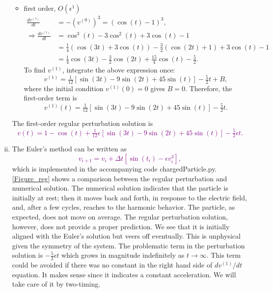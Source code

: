 \documentclass[12pt]{article}
\begin{document}
\begin{ex}
\begin{solution}
\begin{enumerate}[(i)]
\begin{itemize}
    \item first order, $O(\epsilon^1)$
      \begin{align*}
        \frac{dv^{(1)}}{dt}&=-\left(v^{(0)}\right)^3=(\cos(t)-1)^3,\\
        \Rightarrow\frac{dv^{(1)}}{dt}&=\cos^3(t)-3\cos^2(t)+3\cos(t)-1\\
        &=\tfrac{1}{4}(\cos(3t)+3\cos(t))-\tfrac{3}{2}(\cos(2t)+1)+3\cos(t)-1\\
        &=\tfrac{1}{4}\cos(3t)-\tfrac{3}{2}\cos(2t)+\tfrac{15}{4}\cos(t)-\tfrac{5}{2}.
      \end{align*}
      To find $v^{(1)}$, integrate the above expression once:
      $$v^{(1)}=\tfrac{1}{12}\left[\sin(3t)-9\sin(2t)+45\sin(t)\right]-\tfrac{5}{2}t+B,$$
      where the initial condition $v^{(1)}(0)=0$ gives $B=0$. Therefore, the first-order term is
      $$v^{(1)}(t)=\tfrac{1}{12}\left[\sin(3t)-9\sin(2t)+45\sin(t)\right]-\tfrac{5}{2}t.$$
    \end{itemize}

    The first-order regular perturbation solution is\textcolor{purple}{
      $$v(t)=1-\cos(t)+\tfrac{1}{12}\epsilon\left[\sin(3t)-9\sin(2t)+45\sin(t)\right]-\tfrac{5}{2}\epsilon t.$$}

  \item The Euler's method can be written as
    \textcolor{purple}{$$v_{i+1}=v_i+\Delta t\left[\sin(t_i)-\epsilon v_i^3\right],$$}%
    which is implemented in the accompanying code chargedParticle.py. \autoref{Figure_reg} shows a comparison between the regular perturbation and numerical solution. The numerical solution indicates that the particle is initially at rest; then it moves back and forth, in response to the electric field, and, after a few cycles, reaches to the harmonic behavior. The particle, as expected, does not move on average. The regular perturbation solution, however, does not provide a proper prediction. We see that it is initially aligned with the Euler's solution but veers off eventually. This is unphysical given the symmetry of the system. The problematic term in the perturbation solution is $-\tfrac{5}{2}\epsilon t$ which grows in magnitude indefinitely as $t\to\infty$. This term could be avoided if there was no constant in the right hand side of $dv^{(1)}/dt$ equation. It makes sense since it indicates a constant acceleration. We will take care of it by two-timing.
    

\end{enumerate}
\end{solution}
\end{ex}
\end{document}

